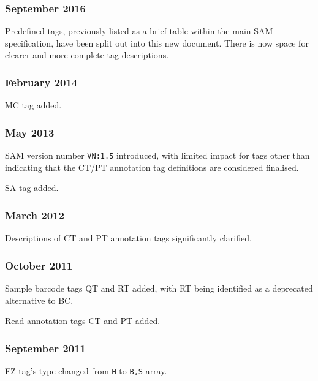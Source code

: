 \documentclass[10pt]{article}
\begin{document}
\begin{appendices}
\subsubsection*{September 2016}

Predefined tags, previously listed as a brief table within the main SAM specification, have been split out into this new document.
There is now space for clearer and more complete tag descriptions.

\subsubsection*{February 2014}

MC tag added.

\subsubsection*{May 2013}

SAM version number {\tt VN:1.5} introduced, with limited impact for tags other than indicating that the CT/PT annotation tag definitions are considered finalised.

\gap
SA tag added.

\subsubsection*{March 2012}

Descriptions of CT and PT annotation tags significantly clarified.

\subsubsection*{October 2011}

Sample barcode tags QT and RT added, with RT being identified as a deprecated alternative to BC.

Read annotation tags CT and PT added.

\subsubsection*{September 2011}

FZ tag's type changed from {\tt H} to {\tt B,S}-array.


\end{appendices}
\end{document}
